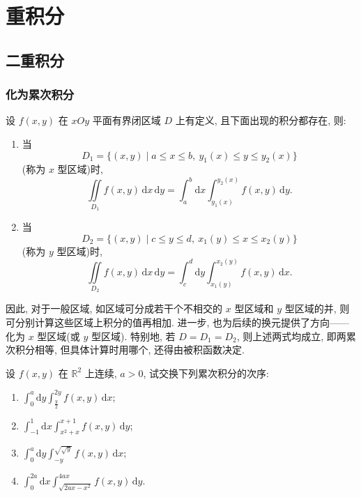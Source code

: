 \documentclass[../../数学分析培优讲义.tex]{subfiles}
\begin{document}
\setcounter{chapter}{11}
\pagestyle{fancy}

\chapter{重积分}


\section{二重积分}


\subsection{化为累次积分}

设 $f(x,y)$ 在 $xOy$ 平面有界闭区域 $D$ 上有定义, 且下面出现的积分都存在, 则:

\begin{enumerate}[label=(\arabic*)]
    \item 当
    \[
        D_1=\{(x,y)\mid a\leq x\leq b,\ y_1(x)\leq y\leq y_2(x)\}
    \]
    (称为 $x$ 型区域)时,
    \[
        \iint\limits_{D_1}f(x,y)\,\mathrm{d}x\,\mathrm{d}y
        =\int_a^b\mathrm{d}x\int_{y_1(x)}^{y_2(x)}f(x,y)\,\mathrm{d}y.
    \]

    \item 当
    \[
        D_2=\{(x,y)\mid c\leq y\leq d,\ x_1(y)\leq x\leq x_2(y)\}
    \]
    (称为 $y$ 型区域)时,
    \[
        \iint\limits_{D_2}f(x,y)\,\mathrm{d}x\,\mathrm{d}y
        =\int_c^d\mathrm{d}y\int_{x_1(y)}^{x_2(y)}f(x,y)\,\mathrm{d}x.
    \]
\end{enumerate}

因此, 对于一般区域, 如区域可分成若干个不相交的 $x$ 型区域和 $y$ 型区域的并, 则可分别计算这些区域上积分的值再相加. 进一步, 也为后续的换元提供了方向——化为 $x$ 型区域(或 $y$ 型区域). 特别地, 若 $D=D_1=D_2$, 则上述两式均成立, 即两累次积分相等, 但具体计算时用哪个, 还得由被积函数决定.

\begin{example}
设 $f(x,y)$ 在 $\mathbb{R}^2$ 上连续, $a>0$, 试交换下列累次积分的次序:
\begin{enumerate}[label=(\arabic*)]
    \item $\displaystyle\int_0^a\mathrm{d}y\int_{\frac{y}{2}}^{2y}f(x,y)\,\mathrm{d}x$;
    \item $\displaystyle\int_{-1}^1\mathrm{d}x\int_{x^2+x}^{x+1}f(x,y)\,\mathrm{d}y$;
    \item $\displaystyle\int_0^a\mathrm{d}y\int_{-y}^{\sqrt{\sqrt{y}}}f(x,y)\,\mathrm{d}x$;
    \item $\displaystyle\int_0^{2a}\mathrm{d}x\int_{\sqrt{2ax-x^2}}^{4ax}f(x,y)\,\mathrm{d}y$.
\end{enumerate}
\end{example}
\exampleblank
\end{document}
